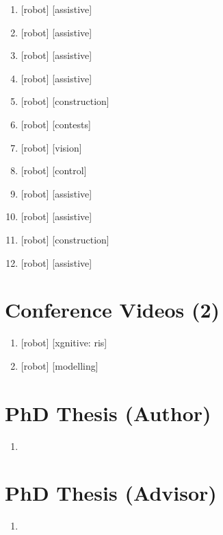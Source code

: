\documentclass{article}
\begin{document}
\begin{enumerate}
  \item {} [robot] [assistive]
  \item {} [robot] [assistive]
  \item {} [robot] [assistive]
  \item {} [robot] [assistive]
  \item {} [robot] [construction]
  \item {} [robot] [contests]
  \item {} [robot] [vision]
  \item {} [robot] [control]
  \item {} [robot] [assistive]
  \item {} [robot] [assistive]
  \item {} [robot] [construction]
  \item {} [robot] [assistive]
\end{enumerate}

\section*{Conference Videos (2)}
\begin{enumerate}
  \item {} [robot] [xgnitive: ris]
  \item {} [robot] [modelling]
\end{enumerate}

\section*{PhD Thesis (Author)}
\begin{enumerate}
  \item {}
\end{enumerate}

\section*{PhD Thesis (Advisor)}
\begin{enumerate}
  \item {}
\end{enumerate}
\end{document}
